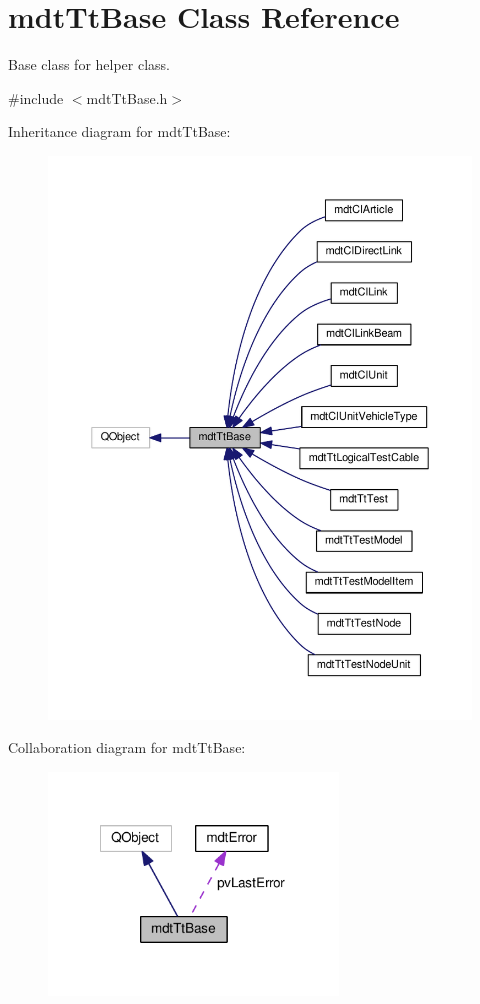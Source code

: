 \hypertarget{classmdt_tt_base}{\section{mdt\-Tt\-Base Class Reference}
\label{classmdt_tt_base}
}


Base class for helper class.  




{\ttfamily \#include $<$mdt\-Tt\-Base.\-h$>$}



Inheritance diagram for mdt\-Tt\-Base\-:\nopagebreak
\begin{figure}[H]
\begin{center}
\leavevmode
\includegraphics[width=350pt]{classmdt_tt_base__inherit__graph}
\end{center}
\end{figure}


Collaboration diagram for mdt\-Tt\-Base\-:\nopagebreak
\begin{figure}[H]
\begin{center}
\leavevmode
\includegraphics[width=218pt]{classmdt_tt_base__coll__graph}
\end{center}
\end{figure}
